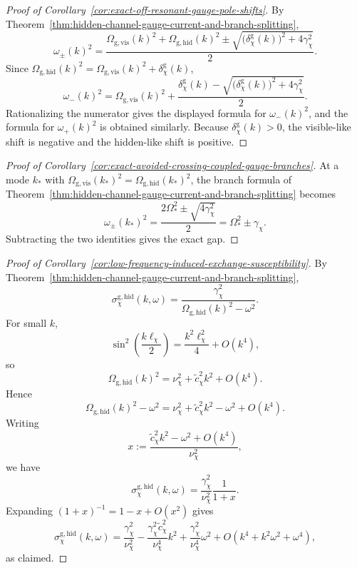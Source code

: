 \begin{proof}[Proof of Corollary~\ref{cor:exact-off-resonant-gauge-pole-shifts}]
\label{proof:cor:exact-off-resonant-gauge-pole-shifts}
By Theorem~\ref{thm:hidden-channel-gauge-current-and-branch-splitting},
\[
\omega_{\pm}(k)^2
=
\frac{
\Omega_{\mathrm{g,vis}}(k)^2+\Omega_{\mathrm{g,hid}}(k)^2
\pm
\sqrt{
\bigl(\delta_{\chi}^{\mathrm g}(k)\bigr)^2+4\gamma_{\chi}^2
}
}{2}.
\]
Since
\(\Omega_{\mathrm{g,hid}}(k)^2=\Omega_{\mathrm{g,vis}}(k)^2+\delta_{\chi}^{\mathrm g}(k)\),
\[
\omega_-(k)^2
=
\Omega_{\mathrm{g,vis}}(k)^2
+
\frac{
\delta_{\chi}^{\mathrm g}(k)
-
\sqrt{
\bigl(\delta_{\chi}^{\mathrm g}(k)\bigr)^2+4\gamma_{\chi}^2
}
}{2}.
\]
Rationalizing the numerator gives the displayed formula for \(\omega_-(k)^2\),
and the formula for \(\omega_+(k)^2\) is obtained similarly. Because
\(\delta_{\chi}^{\mathrm g}(k)>0\), the visible-like shift is negative and the
hidden-like shift is positive.
\end{proof}

\begin{proof}[Proof of Corollary~\ref{cor:exact-avoided-crossing-coupled-gauge-branches}]
\label{proof:cor:exact-avoided-crossing-coupled-gauge-branches}
At a mode \(k_\ast\) with
\(\Omega_{\mathrm{g,vis}}(k_\ast)^2=\Omega_{\mathrm{g,hid}}(k_\ast)^2\), the
branch formula of
Theorem~\ref{thm:hidden-channel-gauge-current-and-branch-splitting} becomes
\[
\omega_{\pm}(k_\ast)^2
=
\frac{2\Omega_{\ast}^2\pm\sqrt{4\gamma_{\chi}^2}}{2}
=
\Omega_{\ast}^2\pm\gamma_{\chi}.
\]
Subtracting the two identities gives the exact gap.
\end{proof}

\begin{proof}[Proof of Corollary~\ref{cor:low-frequency-induced-exchange-susceptibility}]
\label{proof:cor:low-frequency-induced-exchange-susceptibility}
By Theorem~\ref{thm:hidden-channel-gauge-current-and-branch-splitting},
\[
\sigma_{\chi}^{\mathrm{g,hid}}(k,\omega)
=
\frac{\gamma_{\chi}^2}{
\Omega_{\mathrm{g,hid}}(k)^2-\omega^2
}.
\]
For small \(k\),
\[
\sin^2\!\left(\frac{k\ell_{\chi}}{2}\right)
=
\frac{k^2\ell_{\chi}^2}{4}+O(k^4),
\]
so
\[
\Omega_{\mathrm{g,hid}}(k)^2
=
\nu_{\chi}^2+\widetilde c_{\chi}^2k^2+O(k^4).
\]
Hence
\[
\Omega_{\mathrm{g,hid}}(k)^2-\omega^2
=
\nu_{\chi}^2+\widetilde c_{\chi}^2k^2-\omega^2+O(k^4).
\]
Writing
\[
x
:=
\frac{\widetilde c_{\chi}^2k^2-\omega^2+O(k^4)}{\nu_{\chi}^2},
\]
we have
\[
\sigma_{\chi}^{\mathrm{g,hid}}(k,\omega)
=
\frac{\gamma_{\chi}^2}{\nu_{\chi}^2}\frac{1}{1+x}.
\]
Expanding \((1+x)^{-1}=1-x+O(x^2)\) gives
\[
\sigma_{\chi}^{\mathrm{g,hid}}(k,\omega)
=
\frac{\gamma_{\chi}^2}{\nu_{\chi}^2}
-
\frac{\gamma_{\chi}^2\widetilde c_{\chi}^2}{\nu_{\chi}^4}k^2
+
\frac{\gamma_{\chi}^2}{\nu_{\chi}^4}\omega^2
+
O(k^4+k^2\omega^2+\omega^4),
\]
as claimed.
\end{proof}

